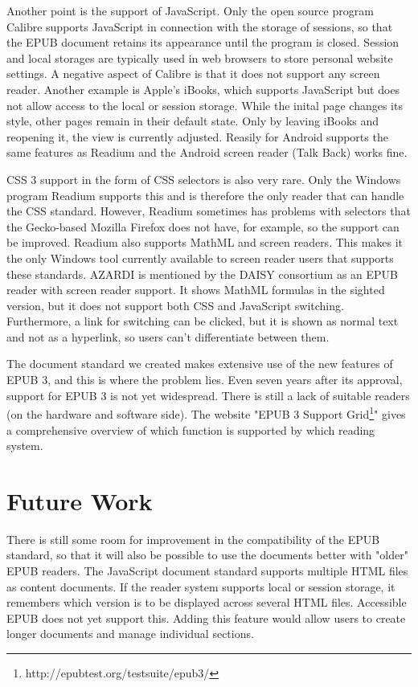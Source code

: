 \documentclass[runningheads,a4paper]{llncs}
\begin{document}
Another point is the support of JavaScript. Only the open source program Calibre supports JavaScript in connection with the storage of sessions, so that the EPUB document retains its appearance until the program is closed. Session and local storages are typically used in web browsers to store personal website settings. A negative aspect of Calibre is that it does not support any screen reader. Another example is Apple's iBooks, which supports JavaScript but does not allow access to the local or session storage. While the inital page changes its style, other pages remain in their default state. Only by leaving iBooks and reopening it, the view is currently adjusted. Reasily for Android supports the same features as Readium and the Android screen reader (Talk Back) works fine. 

CSS 3 support in the form of CSS selectors is also very rare. Only the Windows program Readium supports this and is therefore the only reader that can handle the CSS standard. However, Readium sometimes has problems with selectors that the Gecko-based Mozilla Firefox does not have, for example, so the support can be improved. Readium also supports MathML and screen readers. This makes it the only Windows tool currently available to screen reader users that supports these standards. 
AZARDI is mentioned by the DAISY consortium as an EPUB reader with screen reader support. It shows MathML formulas in the sighted version, but it does not support both CSS and JavaScript switching. Furthermore, a link for switching can be clicked, but it is shown as normal text and not as a hyperlink, so users can’t differentiate between them.

The document standard we created makes extensive use of the new features of EPUB 3, and this is where the problem lies. Even seven years after its approval, support for EPUB 3 is not yet widespread. There is still a lack of suitable readers (on the hardware and software side). The website "EPUB 3 Support Grid\footnote{http://epubtest.org/testsuite/epub3/}" gives a comprehensive overview of which function is supported by which reading system. 

\section{Future Work}
There is still some room for improvement in the compatibility of the EPUB standard, so that it will also be possible to use the documents better with "older" EPUB readers. 
The JavaScript document standard supports multiple HTML files as content documents. If the reader system supports local or session storage, it remembers which version is to be displayed across several HTML files. Accessible EPUB does not yet support this. Adding this feature would allow users to create longer documents and manage individual sections.
\end{document}
